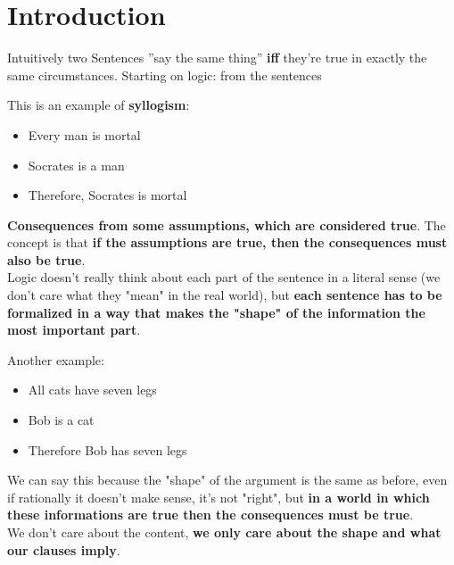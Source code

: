 
	\chapter{Introduction}


	Intuitively two Sentences ''say the same thing'' \textbf{iff} they're true in exactly the same circumstances.
	Starting on logic: from the sentences
	\begin{example} This is an example of \textbf{syllogism}:
	  \begin{itemize}
		\item Every man is mortal
		\item Socrates is a man
			  \\ \bline
		\item Therefore, Socrates is mortal
	  \end{itemize}
	\end{example}

	 \textbf{Consequences from some assumptions, which are considered true}.
	The concept is that \textbf{if the assumptions are true, then the consequences must also be true}. \\

	Logic doesn't really think about each part of the sentence in a literal sense (we don't care what they "mean" in the real world), but \textbf{each sentence has to be formalized in a way that makes the "shape" of the information the most important part}.

	\begin{example} Another example:
	  \begin{itemize}
		\item All cats have seven legs
		\item Bob is a cat
			  \\ \bline
		\item Therefore Bob has seven legs
	  \end{itemize}
	\end{example}

	We can say this because the "shape" of the argument is the same as before, even if rationally it doesn't make sense, it's not "right", but \textbf{in a world in which these informations are true then the consequences must be true}.\\

	We don't care about the content, \textbf{we only care about the shape and what our clauses imply}.

